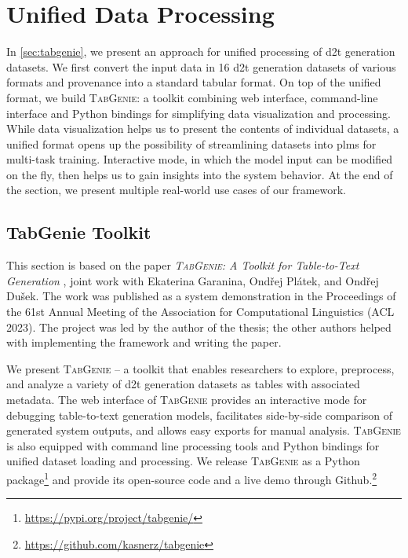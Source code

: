 
\chapter{Unified Data Processing}
\label{chap:tabgenie}

In \autoref{sec:tabgenie}, we present an approach for unified processing of \ac{d2t} generation datasets. We first convert the input data in 16 \ac{d2t} generation datasets of various formats and provenance into a standard tabular format. On top of the unified format, we build \textsc{TabGenie}: a toolkit combining web interface, command-line interface and Python bindings for simplifying data visualization and processing. While data visualization helps us to present the contents of individual datasets, a unified format opens up the possibility of streamlining datasets into \acp{plm} for multi-task training. Interactive mode, in which the model input can be modified on the fly, then helps us to gain insights into the system behavior. At the end of the section, we present multiple real-world use cases of our framework.


\section{TabGenie Toolkit}
\label{sec:tabgenie}

\begin{refbox}
    This section is based on the paper \emph{\textsc{TabGenie}: A Toolkit for Table-to-Text Generation} \cite{kasnerTabGenieToolkitTabletoText2023}, joint work with Ekaterina Garanina, Ondřej Plátek, and Ondřej Dušek. The work was published as a system demonstration in the Proceedings of the 61st Annual Meeting of the Association for Computational Linguistics (ACL 2023). The project was led by the author of the thesis; the other authors helped with implementing the framework and writing the paper.
\end{refbox}


We present \textsc{TabGenie} -- a toolkit that enables researchers to explore, preprocess, and analyze a variety of \ac{d2t} generation datasets as tables with associated metadata. The web interface of \textsc{TabGenie} provides an interactive mode for debugging table-to-text generation models, facilitates side-by-side comparison of generated system outputs, and allows easy exports for manual analysis. \textsc{TabGenie} is also equipped with command line processing tools and Python bindings for unified dataset loading and processing. We release \textsc{TabGenie} as a Python package\footnote{\url{https://pypi.org/project/tabgenie/}} and provide its open-source code and a live demo through Github.\footnote{\url{https://github.com/kasnerz/tabgenie}}

